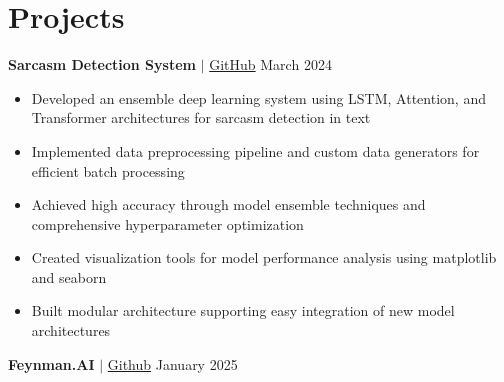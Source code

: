 \section*{Projects}
\textbf{Sarcasm Detection System} $|$ \href{https://github.com/AlhichriMaster/sarcasm-detection}{GitHub} \hfill March 2024
\begin{justify}
\begin{itemize}[noitemsep,leftmargin=20pt]
\item Developed an ensemble deep learning system using LSTM, Attention, and Transformer architectures for sarcasm detection in text
\item Implemented data preprocessing pipeline and custom data generators for efficient batch processing
\item Achieved high accuracy through model ensemble techniques and comprehensive hyperparameter optimization
\item Created visualization tools for model performance analysis using matplotlib and seaborn
\item Built modular architecture supporting easy integration of new model architectures
\end{itemize}
\end{justify}
\textbf{Feynman.AI} $|$ \href{https://github.com/Recite1/FeynMind}{Github} \hfill January 2025 